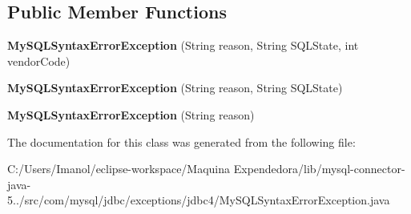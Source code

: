 \subsection*{Public Member Functions}
\begin{DoxyCompactItemize}
\item 
\mbox{\label{classcom_1_1mysql_1_1jdbc_1_1exceptions_1_1jdbc4_1_1_my_s_q_l_syntax_error_exception_a027d8e1a9db695f2b318683eac052e27}} 
{\bfseries My\+S\+Q\+L\+Syntax\+Error\+Exception} (String reason, String S\+Q\+L\+State, int vendor\+Code)
\item 
\mbox{\label{classcom_1_1mysql_1_1jdbc_1_1exceptions_1_1jdbc4_1_1_my_s_q_l_syntax_error_exception_af62330fdde4c1b022fa408ffb3055487}} 
{\bfseries My\+S\+Q\+L\+Syntax\+Error\+Exception} (String reason, String S\+Q\+L\+State)
\item 
\mbox{\label{classcom_1_1mysql_1_1jdbc_1_1exceptions_1_1jdbc4_1_1_my_s_q_l_syntax_error_exception_a1ecad943c1644d7b44cbdacf1589a8d9}} 
{\bfseries My\+S\+Q\+L\+Syntax\+Error\+Exception} (String reason)
\end{DoxyCompactItemize}


The documentation for this class was generated from the following file\+:\begin{DoxyCompactItemize}
\item 
C\+:/\+Users/\+Imanol/eclipse-\/workspace/\+Maquina Expendedora/lib/mysql-\/connector-\/java-\/5../src/com/mysql/jdbc/exceptions/jdbc4/My\+S\+Q\+L\+Syntax\+Error\+Exception.\+java\end{DoxyCompactItemize}
